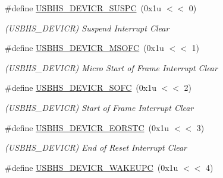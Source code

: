 \begin{DoxyCompactItemize}
\mbox{\label{group__SAMV71__USBHS_ga9e2ea299b3e4a3f7ec15edbd5def56d9}} 
\#define \mbox{\hyperlink{group__SAMV71__USBHS_ga9e2ea299b3e4a3f7ec15edbd5def56d9}{U\+S\+B\+H\+S\+\_\+\+D\+E\+V\+I\+C\+R\+\_\+\+S\+U\+S\+PC}}~(0x1u $<$$<$ 0)
\begin{DoxyCompactList}\small\item\em (U\+S\+B\+H\+S\+\_\+\+D\+E\+V\+I\+CR) Suspend Interrupt Clear \end{DoxyCompactList}\item 
\mbox{\label{group__SAMV71__USBHS_ga2486ae0dbcb8cd35efc0aa238a766d4f}} 
\#define \mbox{\hyperlink{group__SAMV71__USBHS_ga2486ae0dbcb8cd35efc0aa238a766d4f}{U\+S\+B\+H\+S\+\_\+\+D\+E\+V\+I\+C\+R\+\_\+\+M\+S\+O\+FC}}~(0x1u $<$$<$ 1)
\begin{DoxyCompactList}\small\item\em (U\+S\+B\+H\+S\+\_\+\+D\+E\+V\+I\+CR) Micro Start of Frame Interrupt Clear \end{DoxyCompactList}\item 
\mbox{\label{group__SAMV71__USBHS_gaffa039519be07398014a73c69f85f5ba}} 
\#define \mbox{\hyperlink{group__SAMV71__USBHS_gaffa039519be07398014a73c69f85f5ba}{U\+S\+B\+H\+S\+\_\+\+D\+E\+V\+I\+C\+R\+\_\+\+S\+O\+FC}}~(0x1u $<$$<$ 2)
\begin{DoxyCompactList}\small\item\em (U\+S\+B\+H\+S\+\_\+\+D\+E\+V\+I\+CR) Start of Frame Interrupt Clear \end{DoxyCompactList}\item 
\mbox{\label{group__SAMV71__USBHS_ga74ab01c2fc258f8624d8ef2258a234a6}} 
\#define \mbox{\hyperlink{group__SAMV71__USBHS_ga74ab01c2fc258f8624d8ef2258a234a6}{U\+S\+B\+H\+S\+\_\+\+D\+E\+V\+I\+C\+R\+\_\+\+E\+O\+R\+S\+TC}}~(0x1u $<$$<$ 3)
\begin{DoxyCompactList}\small\item\em (U\+S\+B\+H\+S\+\_\+\+D\+E\+V\+I\+CR) End of Reset Interrupt Clear \end{DoxyCompactList}\item 
\mbox{\label{group__SAMV71__USBHS_ga8fecdd7991b62569cb29696878645573}} 
\#define \mbox{\hyperlink{group__SAMV71__USBHS_ga8fecdd7991b62569cb29696878645573}{U\+S\+B\+H\+S\+\_\+\+D\+E\+V\+I\+C\+R\+\_\+\+W\+A\+K\+E\+U\+PC}}~(0x1u $<$$<$ 4)
$$
\end{DoxyCompactItemize}
